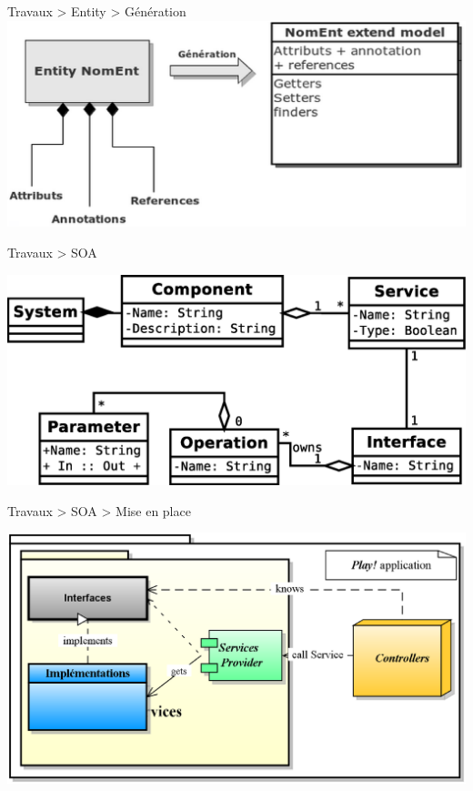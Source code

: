 \documentclass[HeilHazel,pdf,final,colorBG,slideColor]{prosper}
\begin{document}
\begin{slide}{Travaux > Entity > Génération}
  \bc{}
    \includegraphics[scale=.4]{img/entity_gen.eps} 
  \ec{}
\end{slide}


\begin{slide}{Travaux > SOA}

  \bc{} 
    \includegraphics[scale=.45]{img/SOA_simple.eps}
  \ec{}

\end{slide}

\begin{slide}{Travaux > SOA > Mise en place}

  \bc{} 
    \includegraphics[scale=.3]{img/SOA_impl.eps} 
  \ec{}

\end{slide}
\end{document}
